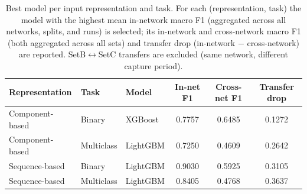 \begin{table}
\caption{Best model per input representation and task. For each (representation, task) the model with the highest mean in-network macro F1 (aggregated across all networks, splits, and runs) is selected; its in-network and cross-network macro F1 (both aggregated across all sets) and transfer drop (in-network $-$ cross-network) are reported. SetB$\leftrightarrow$SetC transfers are excluded (same network, different capture period).}
\label{tab:q3_best_repr}
\begin{tabular}{lllccc}
\toprule
Representation & Task & Model & In-net F1 & Cross-net F1 & Transfer drop \\
\midrule
Component-based & Binary & XGBoost & 0.7757 & 0.6485 & 0.1272 \\
Component-based & Multiclass & LightGBM & 0.7250 & 0.4609 & 0.2642 \\
Sequence-based & Binary & LightGBM & 0.9030 & 0.5925 & 0.3105 \\
Sequence-based & Multiclass & LightGBM & 0.8405 & 0.4768 & 0.3637 \\
\bottomrule
\end{tabular}
\end{table}
